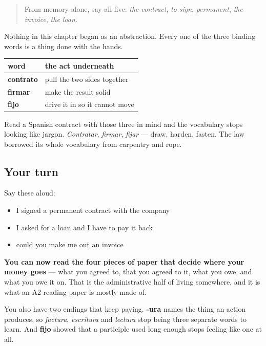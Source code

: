 \label{lesson:ES-R441-repaso-trato}



\begin{quote}
From memory alone, say all five: \emph{the contract}, \emph{to sign}, \emph{permanent}, \emph{the invoice}, \emph{the loan}.
\end{quote}

\begin{grammarlens}[title={Grammar Lens: paperwork is a set of physical acts}]
Nothing in this chapter began as an abstraction. Every one of the three binding words is a thing done with the hands.

\noindent
\begin{tabularx}{\linewidth}{@{}>{\raggedright\arraybackslash}X>{\raggedright\arraybackslash}X@{}}
\toprule
\textbf{word} & \textbf{the act underneath} \\
\midrule
\textbf{contrato} & pull the two sides together \\
\textbf{firmar} & make the result solid \\
\textbf{fijo} & drive it in so it cannot move \\
\bottomrule
\end{tabularx}

Read a Spanish contract with those three in mind and the vocabulary stops looking like jargon. \emph{Contratar}, \emph{firmar}, \emph{fijar} — draw, harden, fasten. The law borrowed its whole vocabulary from carpentry and rope.
\end{grammarlens}

\subsection*{Your turn}
Say these aloud:

\begin{itemize}
\raggedright
  \item I signed a permanent contract with the company
  \item I asked for a loan and I have to pay it back
  \item could you make me out an invoice
\end{itemize}

\begin{grammarlens}[title={What you've built}]
\textbf{You can now read the four pieces of paper that decide where your money goes} — what you agreed to, that you agreed to it, what you owe, and what you owe it on. That is the administrative half of living somewhere, and it is what an A2 reading paper is mostly made of.

You also have two endings that keep paying. \textbf{-ura} names the thing an action produces, so \emph{factura}, \emph{escritura} and \emph{lectura} stop being three separate words to learn. And \textbf{fijo} showed that a participle used long enough stops feeling like one at all.
\end{grammarlens}

